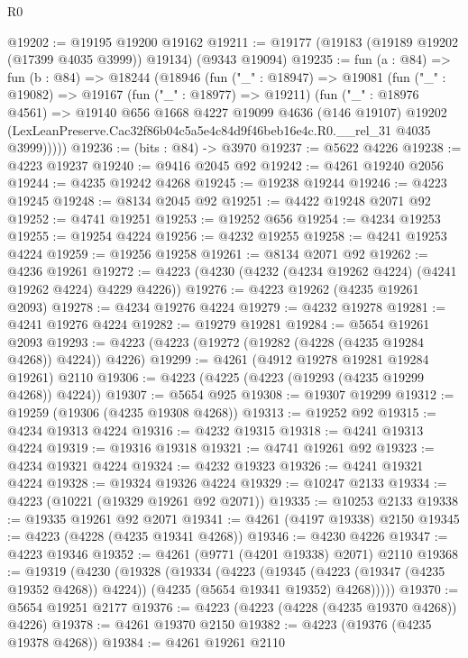 \begin{lexlean}{R0}
\begin{coremodule}
@19202 := @19195 @19200 @19162
@19211 := @19177 (@19183 (@19189 @19202 (@17399 @4035 @3999)) @19134) (@9343 @19094)
@19235 := fun (a : @84) =>
  fun (b : @84) =>
  @18244
    (@18946
      (fun ("_" : @18947) =>
      @19081
        (fun ("_" : @19082) =>
        @19167
          (fun ("_" : @18977) => @19211)
          (fun ("_" : @18976 @4561) =>
          @19140
            @656
            @1668
            @4227
            @19099
            @4636
            (@146 @19107)
            @19202
            (LexLeanPreserve.Cac32f86b04c5a5e4c84d9f46beb16e4c.R0.__rel_31 @4035 @3999)))))
@19236 := (bits : @84) -> @3970
@19237 := @5622 @4226
@19238 := @4223 @19237
@19240 := @9416 @2045 @92
@19242 := @4261 @19240 @2056
@19244 := @4235 @19242 @4268
@19245 := @19238 @19244
@19246 := @4223 @19245
@19248 := @8134 @2045 @92
@19251 := @4422 @19248 @2071 @92
@19252 := @4741 @19251
@19253 := @19252 @656
@19254 := @4234 @19253
@19255 := @19254 @4224
@19256 := @4232 @19255
@19258 := @4241 @19253 @4224
@19259 := @19256 @19258
@19261 := @8134 @2071 @92
@19262 := @4236 @19261
@19272 := @4223 (@4230 (@4232 (@4234 @19262 @4224) (@4241 @19262 @4224) @4229 @4226))
@19276 := @4223 @19262 (@4235 @19261 @2093)
@19278 := @4234 @19276 @4224
@19279 := @4232 @19278
@19281 := @4241 @19276 @4224
@19282 := @19279 @19281
@19284 := @5654 @19261 @2093
@19293 := @4223 (@4223 (@19272 (@19282 (@4228 (@4235 @19284 @4268)) @4224)) @4226)
@19299 := @4261 (@4912 @19278 @19281 @19284 @19261) @2110
@19306 := @4223 (@4225 (@4223 (@19293 (@4235 @19299 @4268)) @4224))
@19307 := @5654 @925
@19308 := @19307 @19299
@19312 := @19259 (@19306 (@4235 @19308 @4268))
@19313 := @19252 @92
@19315 := @4234 @19313 @4224
@19316 := @4232 @19315
@19318 := @4241 @19313 @4224
@19319 := @19316 @19318
@19321 := @4741 @19261 @92
@19323 := @4234 @19321 @4224
@19324 := @4232 @19323
@19326 := @4241 @19321 @4224
@19328 := @19324 @19326 @4224
@19329 := @10247 @2133
@19334 := @4223 (@10221 (@19329 @19261 @92 @2071))
@19335 := @10253 @2133
@19338 := @19335 @19261 @92 @2071
@19341 := @4261 (@4197 @19338) @2150
@19345 := @4223 (@4228 (@4235 @19341 @4268))
@19346 := @4230 @4226
@19347 := @4223 @19346
@19352 := @4261 (@9771 (@4201 @19338) @2071) @2110
@19368 := @19319
    (@4230
      (@19328
        (@19334
          (@4223
            (@19345 (@4223 (@19347 (@4235 @19352 @4268)) @4224))
            (@4235 (@5654 @19341 @19352) @4268)))))
@19370 := @5654 @19251 @2177
@19376 := @4223 (@4223 (@4228 (@4235 @19370 @4268)) @4226)
@19378 := @4261 @19370 @2150
@19382 := @4223 (@19376 (@4235 @19378 @4268))
@19384 := @4261 @19261 @2110

\end{coremodule}
\end{lexlean}
